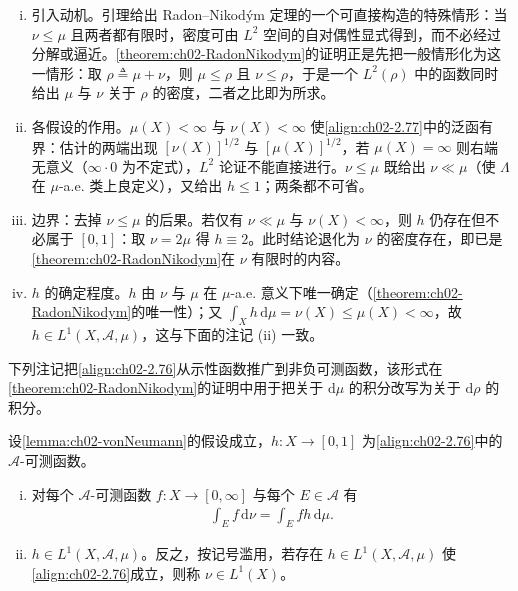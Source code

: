 \documentclass[../../main.tex]{subfiles}%
\begin{document}
\begin{remark}\label{remark:ch02-vonNeumann}
\begin{enumerate}[(i)]
\item 引入动机。引理给出 Radon--Nikodým 定理的一个可直接构造的特殊情形：当 $\nu\leqslant\mu$ 且两者都有限时，密度可由 $L^2$ 空间的自对偶性显式得到，而不必经过分解或逼近。\cref{theorem:ch02-RadonNikodym}的证明正是先把一般情形化为这一情形：取 $\rho\triangleq\mu+\nu$，则 $\mu\leqslant\rho$ 且 $\nu\leqslant\rho$，于是一个 $L^2(\rho)$ 中的函数同时给出 $\mu$ 与 $\nu$ 关于 $\rho$ 的密度，二者之比即为所求。
\item 各假设的作用。$\mu(X)<\infty$ 与 $\nu(X)<\infty$ 使\eqref{align:ch02-2.77}中的泛函有界：估计的两端出现 $[\nu(X)]^{1/2}$ 与 $[\mu(X)]^{1/2}$，若 $\mu(X)=\infty$ 则右端无意义（$\infty\cdot0$ 为不定式），$L^2$ 论证不能直接进行。$\nu\leqslant\mu$ 既给出 $\nu\ll\mu$（使 $\Lambda$ 在 $\mu$-a.e. 类上良定义），又给出 $h\leqslant1$；两条都不可省。
\item 边界：去掉 $\nu\leqslant\mu$ 的后果。若仅有 $\nu\ll\mu$ 与 $\nu(X)<\infty$，则 $h$ 仍存在但不必属于 $[0,1]$：取 $\nu=2\mu$ 得 $h\equiv2$。此时结论退化为 $\nu$ 的密度存在，即已是\cref{theorem:ch02-RadonNikodym}在 $\nu$ 有限时的内容。
\item $h$ 的确定程度。$h$ 由 $\nu$ 与 $\mu$ 在 $\mu$-a.e. 意义下唯一确定（\cref{theorem:ch02-RadonNikodym}的唯一性）；又 $\int_Xh\,\mathrm{d}\mu=\nu(X)\leqslant\mu(X)<\infty$，故 $h\in L^1(X,\mathscr A,\mu)$，这与下面的注记 (ii) 一致。
\end{enumerate}
\end{remark}

下列注记把\eqref{align:ch02-2.76}从示性函数推广到非负可测函数，该形式在\cref{theorem:ch02-RadonNikodym}的证明中用于把关于 $\mathrm{d}\mu$ 的积分改写为关于 $\mathrm{d}\rho$ 的积分。

\begin{remark}\label{remark:ch02-vonNeumann积分}
设\cref{lemma:ch02-vonNeumann}的假设成立，$h:X\to[0,1]$ 为\eqref{align:ch02-2.76}中的 $\mathscr A$-可测函数。
\begin{enumerate}[(i)]
\item 对每个 $\mathscr A$-可测函数 $f:X\to[0,\infty]$ 与每个 $E\in\mathscr A$ 有
\begin{align}
\int_Ef\,\mathrm{d}\nu=\int_Efh\,\mathrm{d}\mu. \label{align:ch02-2.78}
\end{align}
\item $h\in L^1(X,\mathscr A,\mu)$。反之，按记号滥用，若存在 $h\in L^1(X,\mathscr A,\mu)$ 使\eqref{align:ch02-2.76}成立，则称 $\nu\in L^1(X)$。
\end{enumerate}
\end{remark}
\end{document}

